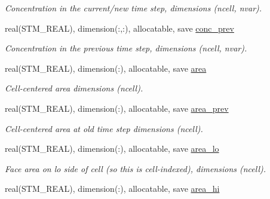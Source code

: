\begin{CompactItemize}
\begin{CompactList}\small\item\em Concentration in the current/new time step, dimensions (ncell, nvar). \item\end{CompactList}\item 
\hypertarget{a00037_af124e746a4207ae1d08f5e9da29a7f4}{
real(STM\_\-REAL), dimension(:,:), allocatable, save \hyperlink{a00037_af124e746a4207ae1d08f5e9da29a7f4}{conc\_\-prev}}
\label{a00037_af124e746a4207ae1d08f5e9da29a7f4}

\begin{CompactList}\small\item\em Concentration in the previous time step, dimensions (ncell, nvar). \item\end{CompactList}\item 
\hypertarget{a00037_ecdc5afda08f6e81ee430c9242d23395}{
real(STM\_\-REAL), dimension(:), allocatable, save \hyperlink{a00037_ecdc5afda08f6e81ee430c9242d23395}{area}}
\label{a00037_ecdc5afda08f6e81ee430c9242d23395}

\begin{CompactList}\small\item\em Cell-centered area dimensions (ncell). \item\end{CompactList}\item 
\hypertarget{a00037_6a9f0568eee7fc988a387e936e425ba3}{
real(STM\_\-REAL), dimension(:), allocatable, save \hyperlink{a00037_6a9f0568eee7fc988a387e936e425ba3}{area\_\-prev}}
\label{a00037_6a9f0568eee7fc988a387e936e425ba3}

\begin{CompactList}\small\item\em Cell-centered area at old time step dimensions (ncell). \item\end{CompactList}\item 
\hypertarget{a00037_985309b3a4af5e33e7cd58b19e18ddf7}{
real(STM\_\-REAL), dimension(:), allocatable, save \hyperlink{a00037_985309b3a4af5e33e7cd58b19e18ddf7}{area\_\-lo}}
\label{a00037_985309b3a4af5e33e7cd58b19e18ddf7}

\begin{CompactList}\small\item\em Face area on lo side of cell (so this is cell-indexed), dimensions (ncell). \item\end{CompactList}\item 
\hypertarget{a00037_834cd43e22376e01bc27a1c1697920e3}{
real(STM\_\-REAL), dimension(:), allocatable, save \hyperlink{a00037_834cd43e22376e01bc27a1c1697920e3}{area\_\-hi}}
\label{a00037_834cd43e22376e01bc27a1c1697920e3}


\end{CompactItemize}
